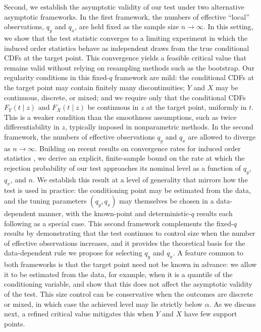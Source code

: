 \documentclass[11pt]{article}
\numberwithin{equation}{section}
\begin{document}
Second, we establish the asymptotic validity of our test under two alternative asymptotic frameworks. In the first framework, the numbers of effective ``local'' observations, $q_y$ and $q_x$, are held fixed as the sample size $n \to \infty$. In this setting, we show that the test statistic converges to a limiting experiment in which the induced order statistics behave as independent draws from the true conditional CDFs at the target point. This convergence yields a feasible critical value that remains valid without relying on resampling methods such as the bootstrap. Our regularity conditions in this fixed-$q$ framework are mild: the conditional CDFs at the target point may contain finitely many discontinuities; $Y$ and $X$ may be continuous, discrete, or mixed; and we require only that the conditional CDFs $F_Y(t \mid z)$ and $F_X(t \mid z)$ be continuous in $z$ at the target point, uniformly in $t$. This is a weaker condition than the smoothness assumptions, such as twice differentiability in $z$, typically imposed in nonparametric methods. In the second framework, the numbers of effective observations $q_y$ and $q_x$ are allowed to diverge as $n \to \infty$. Building on recent results on convergence rates for induced order statistics \citep{bugni/canay/kim:26b}, we derive an explicit, finite-sample bound on the rate at which the rejection probability of our test approaches its nominal level as a function of $q_y$, $q_x$, and $n$. We establish this result at a level of generality that mirrors how the test is used in practice: the conditioning point may be estimated from the data, and the tuning parameters $(q_y, q_x)$ may themselves be chosen in a data-dependent manner, with the known-point and deterministic-$q$ results each following as a special case. This second framework complements the fixed-$q$ results by demonstrating that the test continues to control size when the number of effective observations increases, and it provides the theoretical basis for the data-dependent rule we propose for selecting $q_y$ and $q_x$. A feature common to both frameworks is that the target point need not be known in advance: we allow it to be estimated from the data, for example, when it is a quantile of the conditioning variable, and show that this does not affect the asymptotic validity of the test. This size control can be conservative when the outcomes are discrete or mixed, in which case the achieved level may lie strictly below $\alpha$. As we discuss next, a refined critical value mitigates this when $Y$ and $X$ have few support points.
\end{document}
